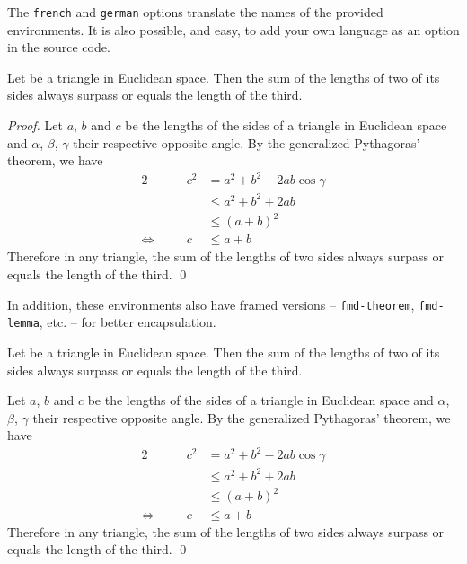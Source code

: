 \documentclass[a4paper, 12pt]{report}
\begin{document}
    \begin{note}
        The \texttt{french} and \texttt{german} options translate the names of the provided environments. It is also possible, and easy, to add your own language as an option in the source code.
    \end{note}

    \begin{theorem}
        Let be a triangle in Euclidean space. Then the sum of the lengths of two of its sides always surpass or equals the length of the third.
    \end{theorem}

    \begin{proof}
        Let $a$, $b$ and $c$ be the lengths of the sides of a triangle in Euclidean space and $\alpha$, $\beta$, $\gamma$ their respective opposite angle. By the generalized Pythagoras' theorem, we have
        \begin{alignat*}{2}
                                  &  & c^2 & = a^2 + b^2 - 2ab \cos\gamma \\
                                  &  &     & \leq a^2 + b^2 + 2ab         \\
                                  &  &     & \leq (a + b)^2               \\
            \Leftrightarrow \quad &  & c   & \leq a + b
        \end{alignat*}
        Therefore in any triangle, the sum of the lengths of two sides always surpass or equals the length of the third. \qed
    \end{proof}

    In addition, these environments also have framed versions -- \texttt{fmd-theorem}, \texttt{fmd-lemma}, etc. -- for better encapsulation.

    \begin{fmd-theorem}\label{thm:Triangle inequality}
        Let be a triangle in Euclidean space. Then the sum of the lengths of two of its sides always surpass or equals the length of the third.
    \end{fmd-theorem}

    \begin{fmd-proof}
        Let $a$, $b$ and $c$ be the lengths of the sides of a triangle in Euclidean space and $\alpha$, $\beta$, $\gamma$ their respective opposite angle. By the generalized Pythagoras' theorem, we have
        \begin{alignat*}{2}
                                  &  & c^2 & = a^2 + b^2 - 2ab \cos\gamma \\
                                  &  &     & \leq a^2 + b^2 + 2ab         \\
                                  &  &     & \leq (a + b)^2               \\
            \Leftrightarrow \quad &  & c   & \leq a + b
        \end{alignat*}
        Therefore in any triangle, the sum of the lengths of two sides always surpass or equals the length of the third. \qed
    \end{fmd-proof}
\end{document}

